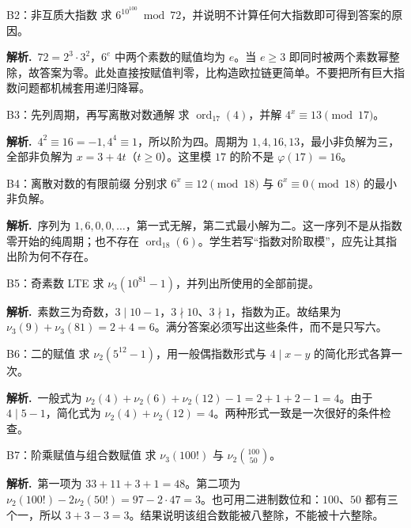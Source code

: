 \documentclass[UTF8,a4paper,11pt,twoside,openright,fontset=fandol]{ctexbook}
\theoremstyle{definition}
\newcommand{\ord}{\operatorname{ord}}
\newcommand{\sol}{\par\noindent\textbf{解析.}\ }
\begin{document}
\begin{problem}{B2：非互质大指数}
求 $6^{10^{100}}\bmod72$，并说明不计算任何大指数即可得到答案的原因。
\end{problem}

\sol $72=2^3\cdot3^2$，$6^e$ 中两个素数的赋值均为 $e$。当 $e\ge3$ 即同时被两个素数幂整除，故答案为零。此处直接按赋值判零，比构造欧拉链更简单。不要把所有巨大指数问题都机械套用递归降幂。


\begin{problem}{B3：先列周期，再写离散对数通解}
求 $\ord_{17}(4)$，并解 $4^x\equiv13\pmod{17}$。
\end{problem}

\sol $4^2\equiv16=-1,4^4\equiv1$，所以阶为四。周期为 $1,4,16,13$，最小非负解为三，全部非负解为 $x=3+4t$（$t\ge0$）。这里模 $17$ 的阶不是 $\varphi(17)=16$。


\begin{problem}{B4：离散对数的有限前缀}
分别求 $6^x\equiv12\pmod{18}$ 与 $6^x\equiv0\pmod{18}$ 的最小非负解。
\end{problem}

\sol 序列为 $1,6,0,0,\ldots$，第一式无解，第二式最小解为二。这一序列不是从指数零开始的纯周期；也不存在 $\ord_{18}(6)$。学生若写“指数对阶取模”，应先让其指出阶为何不存在。


\begin{problem}{B5：奇素数 LTE}
求 $\nu_3(10^{81}-1)$，并列出所使用的全部前提。
\end{problem}

\sol 素数三为奇数，$3\mid10-1$，$3\nmid10$、$3\nmid1$，指数为正。故结果为 $\nu_3(9)+\nu_3(81)=2+4=6$。满分答案必须写出这些条件，而不是只写六。


\begin{problem}{B6：二的赋值}
求 $\nu_2(5^{12}-1)$，用一般偶指数形式与 $4\mid x-y$ 的简化形式各算一次。
\end{problem}

\sol 一般式为 $\nu_2(4)+\nu_2(6)+\nu_2(12)-1=2+1+2-1=4$。由于 $4\mid5-1$，简化式为 $\nu_2(4)+\nu_2(12)=4$。两种形式一致是一次很好的条件检查。


\begin{problem}{B7：阶乘赋值与组合数赋值}
求 $\nu_3(100!)$ 与 $\nu_2\binom{100}{50}$。
\end{problem}

\sol 第一项为 $33+11+3+1=48$。第二项为 $\nu_2(100!)-2\nu_2(50!)=97-2\cdot47=3$。也可用二进制数位和：$100$、$50$ 都有三个一，所以 $3+3-3=3$。结果说明该组合数能被八整除，不能被十六整除。
\end{document}
